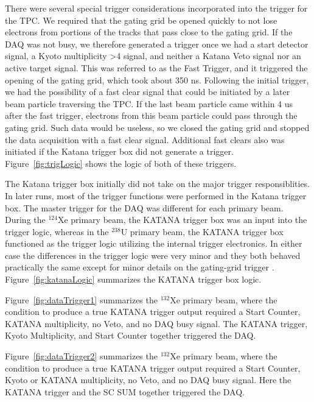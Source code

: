 There were several special trigger considerations incorporated into the trigger for the TPC. We required that the gating grid be opened quickly to not lose electrons from portions of the tracks that pass close to the gating grid. If the DAQ was not busy, we therefore generated a trigger once we had a start detector signal, a Kyoto multiplicity >4 signal, and neither a Katana Veto signal nor an active target signal. This was referred to as the Fast Trigger, and it triggered the opening of the gating grid, which took about 350 ns. Following the initial trigger, we had the possibility of a fast clear signal that could be initiated by a later beam particle traversing the TPC. If the last beam particle came within 4 us after the fast trigger, electrons from this beam particle could pass through the gating grid. Such data would be useless, so we closed the gating grid and stopped the data acquisition with a fast clear signal. Additional fast clears  also was initiated if the Katana trigger box did not generate a trigger. Figure~\ref{fig:trigLogic} shows the logic of both of these triggers.

The Katana trigger box initially did not take on the major trigger responsiblities. In later runs, most of the trigger functions were performed in the Katana trigger box. The master trigger for the DAQ was different for each primary beam. During the ${}^{124}$Xe primary beam, the KATANA trigger box was an input into the trigger logic, whereas in the ${}^{238}$U primary beam, the KATANA trigger box functioned as the trigger logic utilizing the internal trigger electronics. In either case the differences in the trigger logic were very minor and they both behaved practically the same except for minor details on the gating-grid trigger \cite{jon}. Figure~\ref{fig:katanaLogic} summarizes the KATANA trigger box logic. 

Figure~\ref{fig:dataTrigger1} summarizes the ${}^{132}$Xe primary beam, where the condition to produce a true KATANA trigger output required a Start Counter, KATANA multiplicity, no Veto, and no DAQ busy signal. The KATANA trigger, Kyoto Multiplicity, and Start Counter together triggered the DAQ. 

 Figure~\ref{fig:dataTrigger2} summarizes the ${}^{132}$Xe primary beam, where the condition to produce a true KATANA trigger output required a Start Counter, Kyoto or KATANA multiplicity, no Veto, and no DAQ busy signal. Here the KATANA trigger and the SC SUM together triggered the DAQ. 
 
 
